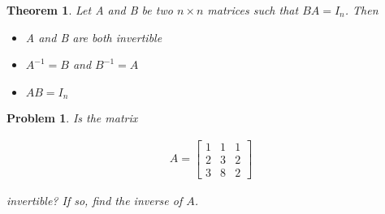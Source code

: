 \documentclass{article}
\newtheorem{theorem}{Theorem}
\newtheorem{problem}{Problem}
\begin{document}
\begin{theorem}
Let A and B be two $n \times n$ matrices such that $BA = I_{n}$. Then

\begin{itemize}
\item A and B are both invertible
\item $A^{-1} = B$ and $B^{-1} = A$
\item $AB = I_{n}$
\end{itemize}
\end{theorem}

\begin{problem}
Is the matrix

\begin{align*}
A = \begin{bmatrix}
1 & 1 & 1 \\
2 & 3 & 2 \\
3 & 8 & 2
\end{bmatrix}
\end{align*}

invertible? If so, find the inverse of $A$.
\end{problem}
\end{document}
